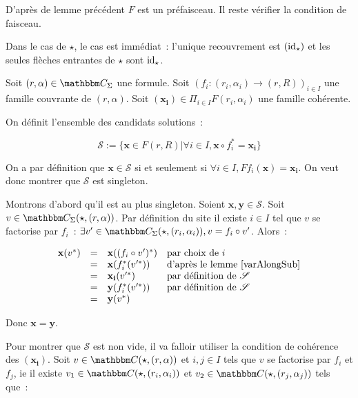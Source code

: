\begin{pv}
    D'après de lemme précédent $F$ est un préfaisceau. Il reste vérifier la condition
    de faisceau.

    Dans le cas de $\star$, le cas est immédiat~: l'unique recouvrement est $(\operatorname{id}_\star)$
    et les seules flèches entrantes de $\star$ sont $\operatorname{id}_\star$.

    Soit $(r,\alpha)\in\C_\Sigma$ une formule. Soit $(f_i : (r_i,
    \alpha_i)\rightarrow (r,R))_{i\in I}$ une famille couvrante de
    $(r,\alpha)$.  Soit $(\mathbf{x_i})\in\Pi_{i\in I} F(r_i,\alpha_i)$ une
    famille cohérente.

    On définit l'ensemble des candidats solutions~:

    \[\mathscr{S} := \{ \mathbf{x}\in F(r,R)
                      | \forall i\in I, \mathbf{x}\circ f_i^* = \mathbf{x_i} \} \]

    On a par définition que $\mathbf{x}\in\mathscr{S}$ si et seulement si
    $\forall i\in I, Ff_i(\mathbf{x}) = \mathbf{x_i}$. On veut donc montrer que
    $\mathscr{S}$ est singleton.

    Montrons d'abord qu'il est au plus singleton. Soient $\mathbf{x},
    \mathbf{y}\in\mathscr{S}$. Soit $v\in\C_\Sigma(\star,(r,\alpha))$.
    Par définition du site il existe $i\in I$ tel que $v$ se factorise
    par $f_i$~: $\exists v'\in\C_\Sigma(\star,(r_i,\alpha_i)), v = f_i\circ v'$.
    Alors~:
    
    \[\begin{array}{rcll}
        \mathbf{x}(v^*) & = & \mathbf{x}((f_i\circ v')^*)
                                 & \text{par choix de } i \\
                        & = & \mathbf{x}(f_i^*(v'^*))
                                 & \text{d'après le lemme \ref{varAlongSub}} \\
                        & = & \mathbf{x_i}(v'^*)
                                 & \text{par définition de }\mathscr{S}\\
                        & = & \mathbf{y}(f_i^*(v'^*))
                                 & \text{par définition de }\mathscr{S}\\
                        & = & \mathbf{y}(v^*) & \\
    \end{array}\]

    Donc $\mathbf{x} = \mathbf{y}$.

    Pour montrer que $\mathscr{S}$ est non vide, il va falloir utiliser la condition de
    cohérence des $(\mathbf{x_i})$. Soit $v\in\C(\star, (r,\alpha))$ et $i,j\in I$ tels
    que $v$ se factorise par $f_i$ et $f_j$, ie
    il existe $v_1\in\C(\star, (r_i,\alpha_i))$ et $v_2\in\C(\star, (r_j,\alpha_j))$ tels
    que~:
    

\end{pv}
